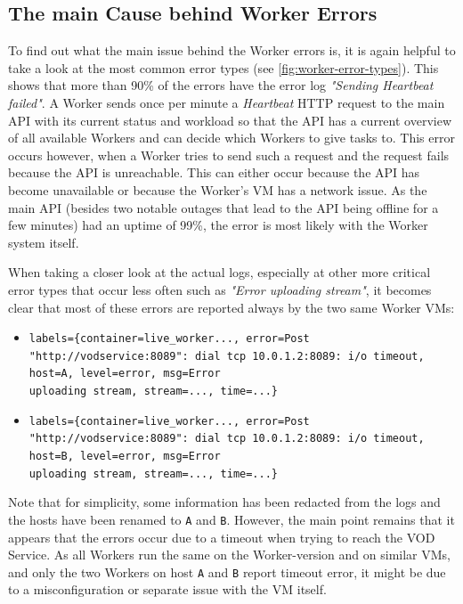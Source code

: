 \subsection{The main Cause behind Worker Errors}

To find out what the main issue behind the Worker errors is, it is again helpful to take a look at the most common error types (see \autoref{fig:worker-error-types}). This shows that more than 90\% of the errors have the error log \textit{"Sending Heartbeat failed"}. A Worker sends once per minute a \textit{Heartbeat} HTTP request to the main \ac{API} with its current status and workload so that the \ac{API} has a current overview of all available Workers and can decide which Workers to give tasks to. This error occurs however, when a Worker tries to send such a request and the request fails because the \ac{API} is unreachable. This can either occur because the \ac{API} has become unavailable or because the Worker's \ac{VM} has a network issue. As the main \ac{API} (besides two notable outages that lead to the \ac{API} being offline for a few minutes) had an uptime of 99\%, the error is most likely with the Worker system itself. 

When taking a closer look at the actual logs, especially at other more critical error types that occur less often such as \textit{"Error uploading stream"}, it becomes clear that most of these errors are reported always by the two same Worker \ac{VM}s:

\begin{itemize}
    \item \texttt{labels=\{container=live\_worker..., error=Post "http://vodservice:8089": dial tcp 10.0.1.2:8089: i/o timeout, host=A, level=error, msg=Error\\ uploading stream, stream=..., time=...\}}

    \item \texttt{labels=\{container=live\_worker..., error=Post "http://vodservice:8089": dial tcp 10.0.1.2:8089: i/o timeout, host=B, level=error, msg=Error\\ uploading stream, stream=..., time=...\}}
\end{itemize}

Note that for simplicity, some information has been redacted from the logs and the hosts have been renamed to \texttt{A} and \texttt{B}. However, the main point remains that it appears that the errors occur due to a timeout when trying to reach the VOD Service. As all Workers run the same on the Worker-version and on similar \ac{VM}s, and only the two Workers on host \texttt{A} and \texttt{B} report timeout error, it might be due to a misconfiguration or separate issue with the \ac{VM} itself. 

